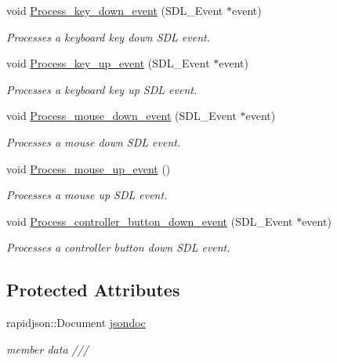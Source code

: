 \begin{DoxyCompactItemize}
void \hyperlink{classjetfuel_1_1control_1_1UIS__manager_a93f728a261ed7f901aad2f5707b46ca8}{Process\+\_\+key\+\_\+down\+\_\+event} (S\+D\+L\+\_\+\+Event $\ast$event)
\begin{DoxyCompactList}\small\item\em Processes a keyboard key down S\+DL event. \end{DoxyCompactList}\item 
void \hyperlink{classjetfuel_1_1control_1_1UIS__manager_a43156fbe06f42df6cdeef4f3c5baa253}{Process\+\_\+key\+\_\+up\+\_\+event} (S\+D\+L\+\_\+\+Event $\ast$event)
\begin{DoxyCompactList}\small\item\em Processes a keyboard key up S\+DL event. \end{DoxyCompactList}\item 
void \hyperlink{classjetfuel_1_1control_1_1UIS__manager_ac2bf8de30a754bdc0a2bd300a79d41bb}{Process\+\_\+mouse\+\_\+down\+\_\+event} (S\+D\+L\+\_\+\+Event $\ast$event)
\begin{DoxyCompactList}\small\item\em Processes a mouse down S\+DL event. \end{DoxyCompactList}\item 
void \hyperlink{classjetfuel_1_1control_1_1UIS__manager_a17413f559bb86a914c39b96c442e2422}{Process\+\_\+mouse\+\_\+up\+\_\+event} ()
\begin{DoxyCompactList}\small\item\em Processes a mouse up S\+DL event. \end{DoxyCompactList}\item 
void \hyperlink{classjetfuel_1_1control_1_1UIS__manager_ab20315b3fd2a89c8f21058385a4ce672}{Process\+\_\+controller\+\_\+button\+\_\+down\+\_\+event} (S\+D\+L\+\_\+\+Event $\ast$event)
\begin{DoxyCompactList}\small\item\em Processes a controller button down S\+DL event. \end{DoxyCompactList}\end{DoxyCompactItemize}
\subsection*{Protected Attributes}
\begin{DoxyCompactItemize}
\item 
rapidjson\+::\+Document \hyperlink{classjetfuel_1_1control_1_1UIS__manager_a83099ccbf9449bf3a3a27d7c7b9b1ff5}{jsondoc}
\begin{DoxyCompactList}\small\item\em member data /// \end{DoxyCompactList}\end{DoxyCompactItemize}


